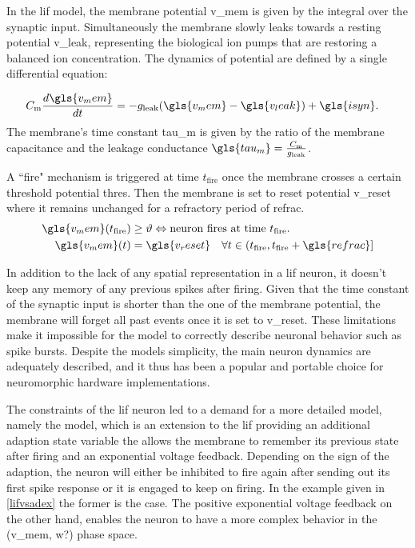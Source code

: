 In the \gls{lif} model, the membrane potential \gls{v_mem} is given by the integral over the synaptic input. Simultaneously the membrane slowly leaks towards a resting potential \gls{v_leak}, representing the biological ion pumps that are restoring a balanced ion concentration. The dynamics of potential are defined by a single differential equation:

\begin{align}
\label{lifeq}
C_{\text{m}} \frac{d\gls{v_mem}}{dt} &= -g_{\text{leak}} (\gls{v_mem} - \gls{v_leak}) + \gls{isyn}.
\end{align}
%
The membrane's time constant \gls{tau_m} is given by the ratio of the membrane capacitance and the leakage conductance $\gls{tau_m} = \frac{C_{\text{m}}}{g_{\text{leak}}}$.

A ``fire" mechanism is triggered at time $t_{\text{fire}}$ once the membrane crosses a certain threshold potential \gls{thres}. Then the membrane is set to reset potential \gls{v_reset} where it remains unchanged for a refractory period of \gls{refrac}. 
\begin{align}
\gls{v_mem}(t_{\text{fire}}) &\ge \vartheta \Leftrightarrow \text{neuron fires at time } t_{\text{fire}}.\\
\gls{v_mem}(t) &= \gls{v_reset} \quad \forall t \in (t_{\text{fire}}, t_{\text{fire}} + \gls{refrac}] 
\end{align}

In addition to the lack of any spatial representation in a \gls{lif} neuron, it doesn't keep any memory of any previous spikes after firing. Given that the time constant of the synaptic input is shorter than the one of the membrane potential, the membrane will forget all past events once it is set to \gls{v_reset}. These limitations make it impossible for the model to correctly describe neuronal behavior such as spike bursts. Despite the models simplicity, the main neuron dynamics are adequately described, and it thus has been a popular and portable choice for neuromorphic hardware implementations.

The constraints of the \gls{lif} neuron led to a demand for a more detailed model, namely the  model, which is an extension to the \gls{lif} providing an additional adaption state variable the allows the membrane to remember its previous state after firing and an exponential voltage feedback. Depending on the sign of the adaption, the neuron will either be inhibited to fire again after sending out its first spike response or it is engaged to keep on firing. In the example given in \cref{lifvsadex} the former is the case. The positive exponential voltage feedback on the other hand, enables the neuron to have a more complex behavior in the (\gls{v_mem}, w?) phase space.


